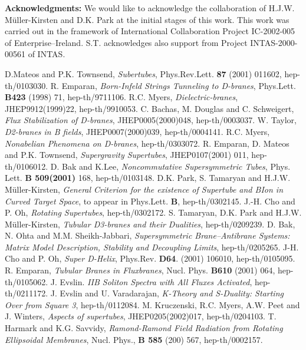 \documentclass[a4paper,12pt]{article}
\begin{document}
\smallskip

{\bf Acknowledgments:}
\newline
We would like to acknowledge the collaboration of H.J.W. M\"uller-Kirsten and D.K. Park at the initial stages of this work. This work was carried out in the framework of International Collaboration Project IC-2002-005 of Enterprise--Ireland. S.T. acknowledges also support from Project INTAS-2000-00561 of INTAS.

\begin{thebibliography}{99}


D.Mateos and P.K. Townsend, {\it Subertubes}, Phys.Rev.Lett. 
{\bf 87} (2001) 011602, hep-th/0103030.
R. Emparan, {\it Born-Infeld Strings Tunneling to D-branes}, 
Phys.Lett. {\bf B423} (1998) 71, hep-th/9711106.
R.C. Myers, {\it Dielectric-branes}, JHEP9912(1999)22, hep-th/9910053.
C. Bachas, M. Douglas and C. Schweigert, {\it Flux Stabilization of D-branes}, JHEP0005(2000)048, hep-th/0003037.
W. Taylor, {\it D2-branes in B fields}, JHEP0007(2000)039, hep-th/0004141.
R.C. Myers, {\it Nonabelian Phenomena on D-branes}, hep-th/0303072.
R. Emparan, D. Mateos and P.K. Townsend, {\it Supergravity Supertubes}, JHEP0107(2001) 011, hep-th/0106012.
D. Bak and K.Lee, {\it Noncommutative Supersymmetric Tubes}, Phys. Lett. {\bf B 509(2001)} 168, hep-th/0103148.
D.K. Park, S. Tamaryan and H.J.W. M\"uller-Kirsten, {\it General Criterion for the existence of Supertube and BIon in Curved Target Space}, to appear in Phys.Lett. {\bf B}, hep-th/0302145.
J.-H. Cho and P. Oh, {\it Rotating Supertubes}, hep-th/0302172.
S. Tamaryan, D.K. Park and H.J.W. M\"uller-Kirsten, {\it Tubular D3-branes and their Dualities}, hep-th/0209239.
D. Bak, N. Ohta and M.M. Sheikh-Jabbari, {\it Supersymmetric Brane--Antibrane Systems: Matrix Model Description, Stability and Decoupling Limits}, hep-th/0205265.
J-H. Cho and P. Oh, {\it Super D-Helix}, Phys.Rev. {\bf D64}. 
(2001) 106010, hep-th/0105095.
R. Emparan, {\it Tubular Branes in Fluxbranes}, Nucl. Phys. {\bf B610} (2001) 064, hep-th/0105062.
J. Evslin. {\it IIB Soliton Spectra with All Fluxes Activated}, hep-th/0211172.
J. Evslin and U. Varadarajan, {\it K-Theory and S-Duality: Starting Over from Square 3}, hep-th/0112084.
M. Kruczenski, R.C. Myers, A.W. Peet and J. Winters, {\it Aspects of supertubes}, JHEP0205(2002)017, hep-th/0204103.
T. Harmark and K.G. Savvidy, {\it Ramond-Ramond Field Radiation from Rotating Ellipsoidal Membranes}, Nucl. Phys., {\bf B 585} (200) 567, hep-th/0002157.


\end{thebibliography}
\end{document}
